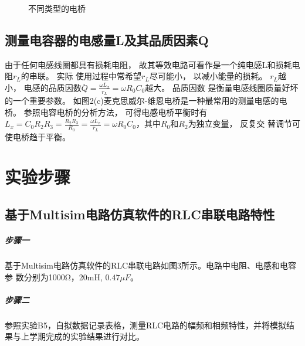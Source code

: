 \documentclass[10pt,a4paper,twocolumn,twoside,UTF8]{ctexart}
\begin{document}
				\begin{figure}[htbp]
					\centering
					\caption{不同类型的电桥}
					\label{fig:2}
				\end{figure}

		\subsection{测量电容器的电感量L及其品质因素Q}
	由于任何电感线圈都具有损耗电阻， 故其等效电路可看作是一个纯电感L和损耗电阻$r_L$的串联。 实际
	使用过程中常希望$r_L$尽可能小， 以减小能量的损耗。 $r_L$越小， 电感的品质因数ܳ$Q=\frac{\omega L_x}{r_L}=\omega R_0 C_0$越大。 品质因数
	ܳ是衡量电感线圈质量好坏的一个重要参数。
	如图2(c)麦克思威尔-维恩电桥是一种最常用的测量电感的电桥。 参照电容电桥的分析方法，
	可得电感电桥平衡时有$L_x=C_0 R_2 R_3=\frac{R_2 R_3}{R_0}=\frac{\omega L_x}{r_L}=\omega R_0 C_0$，其中$R_0$和$R_2$为独立变量， 反复交
	替调节可使电桥趋于平衡。

	\section{实验步骤}
	\subsection{基于Multisim电路仿真软件的RLC串联电路特性}
	\subparagraph{步骤一}基于Multisim电路仿真软件的RLC串联电路如图3所示。电路中电阻、电感和电容参
	数分别为1000Ω，20mH, $0.47\mu F$。
	\subparagraph{步骤二}参照实验B5，自拟数据记录表格，测量RLC电路的幅频和相频特性，并将模拟结果与上学期完成的实验结果进行对比。
	
\end{document}
